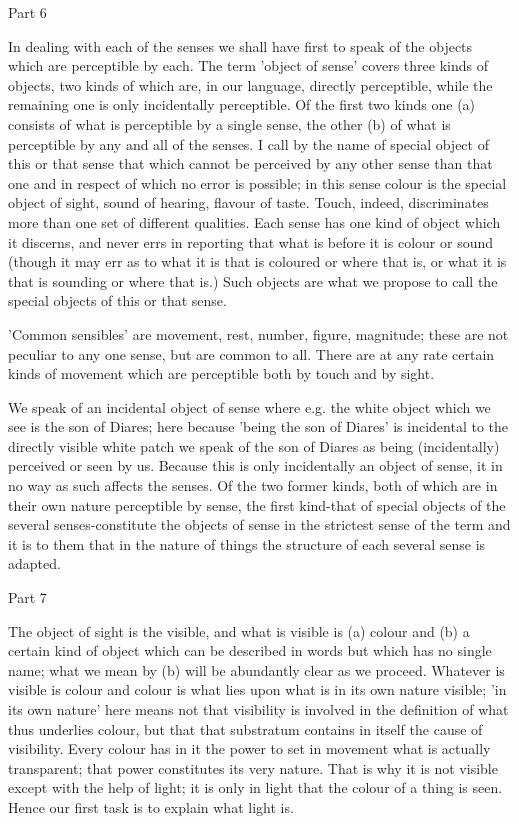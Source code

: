 Part 6

In dealing with each of the senses we shall have first to speak of
the objects which are perceptible by each. The term 'object of sense'
covers three kinds of objects, two kinds of which are, in our language,
directly perceptible, while the remaining one is only incidentally
perceptible. Of the first two kinds one (a) consists of what is perceptible
by a single sense, the other (b) of what is perceptible by any and
all of the senses. I call by the name of special object of this or
that sense that which cannot be perceived by any other sense than
that one and in respect of which no error is possible; in this sense
colour is the special object of sight, sound of hearing, flavour of
taste. Touch, indeed, discriminates more than one set of different
qualities. Each sense has one kind of object which it discerns, and
never errs in reporting that what is before it is colour or sound
(though it may err as to what it is that is coloured or where that
is, or what it is that is sounding or where that is.) Such objects
are what we propose to call the special objects of this or that sense.

'Common sensibles' are movement, rest, number, figure, magnitude;
these are not peculiar to any one sense, but are common to all. There
are at any rate certain kinds of movement which are perceptible both
by touch and by sight. 

We speak of an incidental object of sense where e.g. the white object
which we see is the son of Diares; here because 'being the son of
Diares' is incidental to the directly visible white patch we speak
of the son of Diares as being (incidentally) perceived or seen by
us. Because this is only incidentally an object of sense, it in no
way as such affects the senses. Of the two former kinds, both of which
are in their own nature perceptible by sense, the first kind-that
of special objects of the several senses-constitute the objects of
sense in the strictest sense of the term and it is to them that in
the nature of things the structure of each several sense is adapted.

Part 7

The object of sight is the visible, and what is visible is (a) colour
and (b) a certain kind of object which can be described in words but
which has no single name; what we mean by (b) will be abundantly clear
as we proceed. Whatever is visible is colour and colour is what lies
upon what is in its own nature visible; 'in its own nature' here means
not that visibility is involved in the definition of what thus underlies
colour, but that that substratum contains in itself the cause of visibility.
Every colour has in it the power to set in movement what is actually
transparent; that power constitutes its very nature. That is why it
is not visible except with the help of light; it is only in light
that the colour of a thing is seen. Hence our first task is to explain
what light is. 

